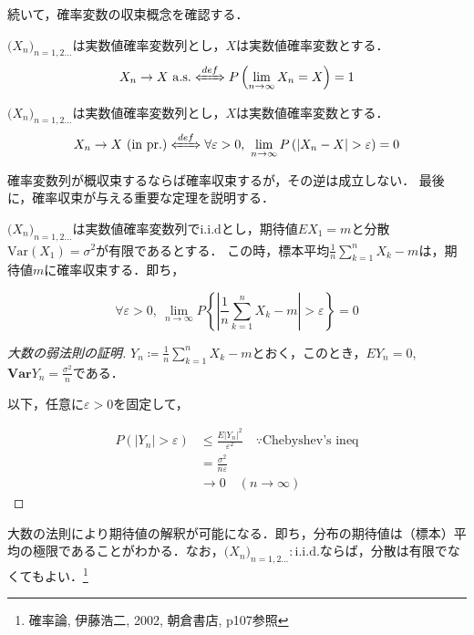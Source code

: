 \documentclass{classes/myclass}
\begin{document}
続いて，確率変数の収束概念を確認する．

\begin{dfn}[概収束]
$\lparen X_n \rparen_{n = 1, 2...}$は実数値確率変数列とし，$X$は実数値確率変数とする．
\[
    X_n \rightarrow X \ \mathrm{a.s.} \xLeftrightarrow[]{def} P \left \lparen \lim_{n \to \infty} X_n = X \right \rparen = 1
\]
\end{dfn}

\begin{dfn}[確率収束]
$\lparen X_n \rparen_{n = 1, 2...}$は実数値確率変数列とし，$X$は実数値確率変数とする．
\[
  X_n \rightarrow X \ (\mathrm{in \ pr.}) \xLeftrightarrow[]{def} \forall \varepsilon > 0, \  \lim_{n \to \infty} P \left \lparen |X_n - X| > \varepsilon \right \rparen = 0
\]
\end{dfn}

確率変数列が概収束するならば確率収束するが，その逆は成立しない．
最後に，確率収束が与える重要な定理を説明する．

\begin{thm}[大数の弱法則]
$\lparen X_n \rparen_{n = 1, 2...}$は実数値確率変数列で$\mathrm{i.i.d}$とし，期待値$EX_1 = m$と分散$\mathrm{Var}(X_1) = \sigma^2$が有限であるとする．
この時，標本平均$\frac{1}{n}\sum_{k = 1}^{n}X_k - m$は，期待値$m$に確率収束する．即ち，

\[
  \forall \varepsilon > 0, \ \lim_{n \to \infty}P\left \lbrace \left|\frac{1}{n}\sum_{k = 1}^{n}X_k - m \right | > \varepsilon \right \rbrace  = 0
\]
\end{thm}

\begin{proof}[大数の弱法則の証明]
$Y_n \coloneq \frac{1}{n} \sum_{k = 1}^n X_k - m$とおく，このとき，$EY_n = 0$, $\mathbf{Var}Y_n = \frac{\sigma^2}{n}$である．

以下，任意に$\varepsilon > 0$を固定して，

\begin{align*}
  P(|Y_n| > \varepsilon) &\leq \frac{E|Y_n|^2}{\varepsilon^2} \quad \because \text{Chebyshev's ineq} \\
  &= \frac{\sigma^2}{n\varepsilon} \\
  &\rightarrow 0 \quad (n \to \infty)
\end{align*}
\end{proof}

大数の法則により期待値の解釈が可能になる．即ち，分布の期待値は（標本）平均の極限であることがわかる．なお，$\lparen X_n \rparen_{n = 1, 2...} : \mathrm{i.i.d.}$ならば，分散は有限でなくてもよい．\footnote{確率論, 伊藤浩二, 2002, 朝倉書店, p107参照}
\end{document}
